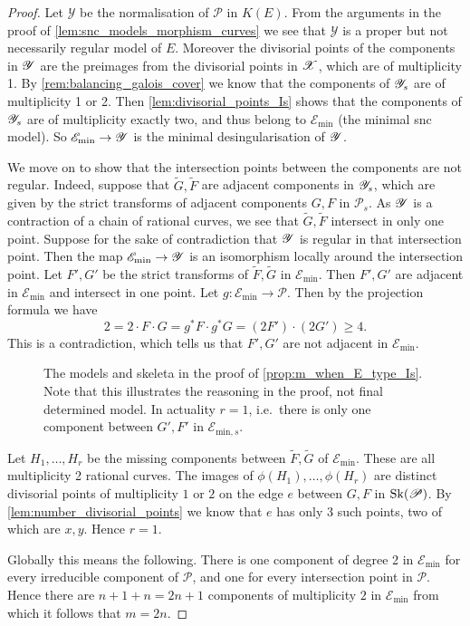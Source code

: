 \begin{proof}
	Let $\mathscr Y$ be the normalisation of $\mathscr P$ in $K(E)$.  
	From the arguments in the proof of \cref{lem:snc_models_morphism_curves} we see that $\mathscr Y$ is a proper but not necessarily regular model of $E$. 
	Moreover the divisorial points of the components in $\mathscr{Y}$ are the preimages from the divisorial points in $\mathscr{X}$, which are of multiplicity 1.
	By \cref{rem:balancing_galois_cover} we know that the components of $\mathscr{Y}_s$ are of multiplicity 1 or 2. 
	Then \cref{lem:divisorial_points_Is} shows that the components of $\mathscr{Y}_s$ are of multiplicity exactly two, and thus belong to $\mathscr E_\text{min} $ (the minimal snc model). 
	So $\mathscr E_\text{min}  \to \mathscr{Y}$ is the minimal desingularisation of $\mathscr{Y}$. 

	We move on to show that the intersection points between the components are not regular.
	Indeed, suppose that $\tilde G, \tilde F$ are adjacent components in $\mathscr{Y}_s$, which are given by the strict transforms of adjacent components  $G, F$ in $\mathscr P_s$.
	As $\mathscr{Y}$ is a contraction of a chain of rational curves, we see that  $\tilde G, \tilde F$ intersect in only one point. 
	Suppose for the sake of contradiction that $\mathscr{Y}$ is regular in that intersection point. 
	Then the map $\mathscr E_\text{min} \to \mathscr{Y}$ is an isomorphism locally around the intersection point.  
	Let $F', G'$ be the strict transforms of $\tilde F, \tilde G$ in $\mathscr E_\text{min} $. 
	Then $F', G'$ are adjacent in $\mathscr E_\text{min} $ and intersect in one point. 
	Let $g: \mathscr E_\text{min}  \to \mathscr P$. 
	Then by the projection formula we have \[
		2 = 2 \cdot  F\cdot  G = g^* F \cdot g^* G = (2  F')\cdot (2 G') \ge 4
	.\] 
	This is a contradiction, which tells us that $ F',  G'$ are not adjacent in $\mathscr E_\text{min} $. 

\begin{figure}[ht]
    \centering
    \caption{The models and skeleta in the proof of \cref{prop:m_when_E_type_Is}. 
    Note that this illustrates the reasoning in the proof, not final determined model. In actuality $r = 1$, i.e.\ there is only one component between $G', F'$ in $\mathscr E_{\text{min},s}$. }
    \label{fig:models_proof_is}
\end{figure}

	Let $H_1, \ldots, H_r$ be the missing components between $\tilde F, \tilde G$ of $\mathscr E_\text{min} $. 
	These are all multiplicity 2 rational curves.
	The images of $\phi(H_1), \ldots, \phi(H_r)$ are distinct divisorial points of multiplicity $1$ or $2$ on the edge $e$ between $G, F$ in $\operatorname{Sk}(\mathscr P)$.
By \cref{lem:number_divisorial_points} we know that $e$ has only 3 such points, two of which are $x, y$. 
Hence $r = 1$. 

 Globally this means the following. 
There is one component of degree 2 in $\mathscr E_\text{min} $ for every irreducible component of $\mathscr P$, and one for every intersection point in $\mathscr P$. 
Hence there are $n + 1 + n = 2n + 1$ components of multiplicity $2$ in $\mathscr E_\text{min} $ from which it follows that $m = 2n$.  




\end{proof}


